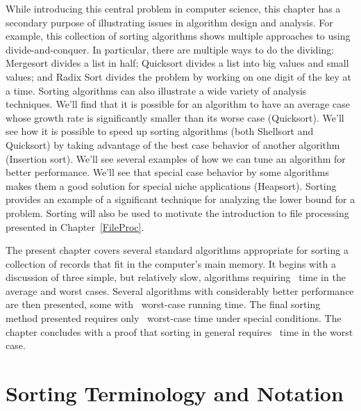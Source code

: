 While introducing this central problem in computer science,
this chapter has a secondary purpose of illustrating
issues in algorithm design and analysis.
For example, this collection of sorting algorithms shows multiple
approaches to using divide-and-conquer.
In particular, there are multiple ways to do the dividing:
Mergesort divides a list in half;
Quicksort divides a list into big values and small values;
and Radix Sort divides the problem by working on one digit of the key
at a time.
Sorting algorithms can also illustrate a wide variety of
analysis techniques.  
We'll find that it is possible for an algorithm to have an average
case whose growth rate is significantly smaller than its worse case
(Quicksort).
We'll see how it is possible to speed up sorting algorithms
(both Shellsort and Quicksort) by taking advantage of the best case
behavior of another algorithm (Insertion sort).
We'll see several examples of how we can tune an algorithm for better
performance. 
We'll see that special case behavior by some algorithms makes them a
good solution for special niche applications (Heapsort).
Sorting provides an example of a significant technique for
analyzing the lower bound for a problem.
Sorting will also be used to motivate the introduction to file
processing presented in
Chapter~\ref{FileProc}. 

The present chapter covers several standard algorithms appropriate
for sorting a collection of records that fit in the computer's
main memory.
It begins with a discussion of three simple, but relatively slow,
algorithms requiring \Thetantwo\ time in the average and worst cases.
Several algorithms with considerably better performance are then
presented, some with \Thetanlogn\ worst-case running time.
The final sorting method presented requires only \Thetan\ worst-case
time under special conditions.
The chapter concludes with a proof that sorting in general
requires \Omeganlogn\ time in the worst case.

\section{Sorting Terminology and Notation}

